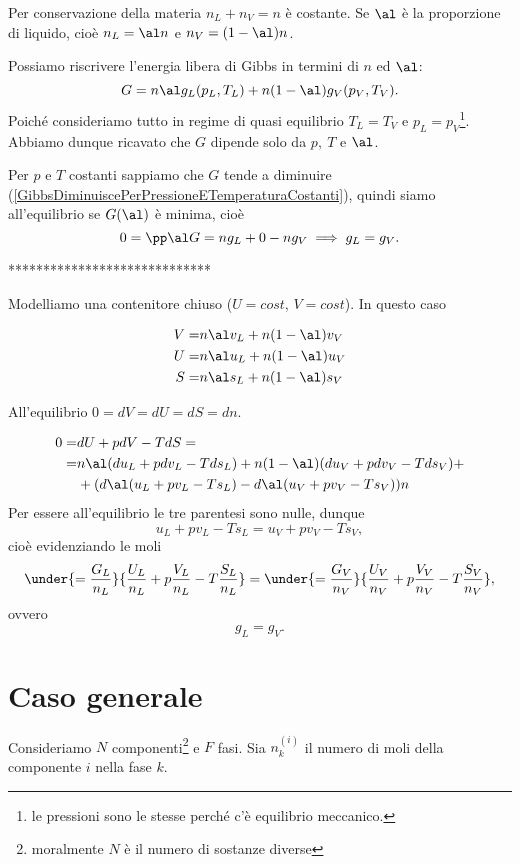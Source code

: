 \begin{remark}
Per conservazione della materia $n_L+n_V=n$ \`e costante. Se $\al$ \`e la proporzione di liquido, cio\`e $n_L=\al n$ e $n_V=(1-\al)n$.
\end{remark}
Possiamo riscrivere l'energia libera di Gibbs in termini di $n$ ed $\al$:
\[G=n\al g_L(p_L,T_L)+n(1-\al)g_V(p_V,T_V).\]
Poich\'e consideriamo tutto in regime di quasi equilibrio $T_L=T_V$ e $p_L=p_V$\footnote{le pressioni sono le stesse perch\'e c'\`e equilibrio meccanico.}. Abbiamo dunque ricavato che $G$ dipende solo da $p,\ T$ e $\al$.

\begin{remark}
Per $p$ e $T$ costanti sappiamo che $G$ tende a diminuire (\ref{GibbsDiminuiscePerPressioneETemperaturaCostanti}), quindi siamo all'equilibrio se $G(\al)$ \`e minima, cio\`e
\[0=\pp\al G=ng_L+0-n g_V\implies g_L=g_V.\]
\end{remark}














*****************************


Modelliamo una contenitore chiuso ($U=cost$, $V=cost$). In questo caso

\begin{align*}
V=&n\al v_L+n(1-\al)v_V\\
U=&n\al u_L+n(1-\al)u_V\\
S=&n\al s_L+n(1-\al)s_V
\end{align*}


All'equilibrio $0=dV=dU=dS=dn$.

\begin{align*}
0=&dU+pdV-TdS=\\
=&n\al (du_L+pdv_L-Tds_L)+n(1-\al)(du_V+pdv_V-Tds_V)+\\
&+(d\al (u_L+pv_L-Ts_L)-d\al (u_V+pv_V-Ts_V))n
\end{align*}
Per essere all'equilibrio le tre parentesi sono nulle, dunque
\[u_L+pv_L-Ts_L=u_V+pv_V-Ts_V,\]
cio\`e evidenziando le moli
\[\under{=\frac{G_L}{n_L}}{\frac{U_L}{n_L}+p\frac{V_L}{n_L}-T\frac{S_L}{n_L}}=\under{=\frac{G_V}{n_V}}{\frac{U_V}{n_V}+p\frac{V_V}{n_V}-T\frac{S_V}{n_V}},\]
ovvero
\[g_L=g_V.\]



\section{Caso generale}
Consideriamo $N$ componenti\footnote{moralmente $N$ \`e il numero di sostanze diverse} e $F$ fasi. Sia $n^{(i)}_k$ il numero di moli della componente $i$ nella fase $k$.\medskip


